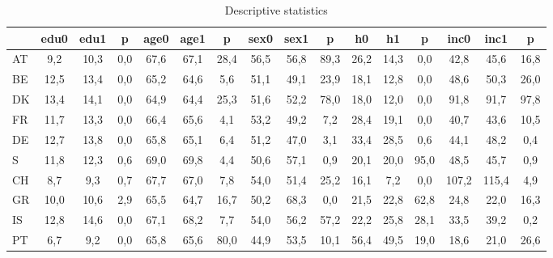 \begin{table}[htbp]
\caption{\label{clabel} Descriptive statistics}\centering\medskip
\begin{tabular}{lccccccccccccccc} \hline \hline
 & edu0  & edu1  & p  & age0  & age1  & p  & sex0  & sex1  & p  & h0  & h1  & p  & inc0  & inc1  & p  \\  \hline 
AT &       9,2 &      10,3 &       0,0 &      67,6 &      67,1 &      28,4 &      56,5 &      56,8 &      89,3 &      26,2 &      14,3 &       0,0 &      42,8 &      45,6 &      16,8 \\  
BE &      12,5 &      13,4 &       0,0 &      65,2 &      64,6 &       5,6 &      51,1 &      49,1 &      23,9 &      18,1 &      12,8 &       0,0 &      48,6 &      50,3 &      26,0 \\  
DK &      13,4 &      14,1 &       0,0 &      64,9 &      64,4 &      25,3 &      51,6 &      52,2 &      78,0 &      18,0 &      12,0 &       0,0 &      91,8 &      91,7 &      97,8 \\  
FR &      11,7 &      13,3 &       0,0 &      66,4 &      65,6 &       4,1 &      53,2 &      49,2 &       7,2 &      28,4 &      19,1 &       0,0 &      40,7 &      43,6 &      10,5 \\  
DE &      12,7 &      13,8 &       0,0 &      65,8 &      65,1 &       6,4 &      51,2 &      47,0 &       3,1 &      33,4 &      28,5 &       0,6 &      44,1 &      48,2 &       0,4 \\  
S &      11,8 &      12,3 &       0,6 &      69,0 &      69,8 &       4,4 &      50,6 &      57,1 &       0,9 &      20,1 &      20,0 &      95,0 &      48,5 &      45,7 &       0,9 \\  
CH &       8,7 &       9,3 &       0,7 &      67,7 &      67,0 &       7,8 &      54,0 &      51,4 &      25,2 &      16,1 &       7,2 &       0,0 &     107,2 &     115,4 &       4,9 \\  
GR &      10,0 &      10,6 &       2,9 &      65,5 &      64,7 &      16,7 &      50,2 &      68,3 &       0,0 &      21,5 &      22,8 &      62,8 &      24,8 &      22,0 &      16,3 \\  
IS &      12,8 &      14,6 &       0,0 &      67,1 &      68,2 &       7,7 &      54,0 &      56,2 &      57,2 &      22,2 &      25,8 &      28,1 &      33,5 &      39,2 &       0,2 \\  
PT &       6,7 &       9,2 &       0,0 &      65,8 &      65,6 &      80,0 &      44,9 &      53,5 &      10,1 &      56,4 &      49,5 &      19,0 &      18,6 &      21,0 &      26,6 \\  

\end{tabular}
\end{table}
